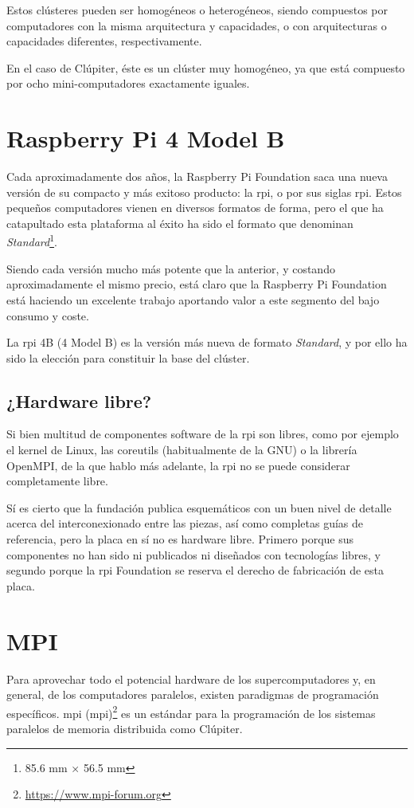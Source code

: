 Estos clústeres pueden ser homogéneos o heterogéneos, siendo compuestos por computadores con la misma arquitectura y capacidades, o con arquitecturas o capacidades diferentes, respectivamente.

En el caso de Clúpiter, éste es un clúster muy homogéneo, ya que está compuesto por ocho mini-computadores exactamente iguales.

\section{Raspberry Pi 4 Model B}
\label{sec:raspberry_pi_4_model_b}
Cada aproximadamente dos años, la Raspberry Pi Foundation saca una nueva versión de su compacto y más exitoso producto: la \acrlong{rpi}, o por sus siglas \acrshort{rpi}. Estos pequeños computadores vienen en diversos formatos de forma, pero el que ha catapultado esta plataforma al éxito ha sido el formato que denominan \textit{Standard}\footnote{85.6 mm × 56.5 mm}.

Siendo cada versión mucho más potente que la anterior, y costando aproximadamente el mismo precio, está claro que la Raspberry Pi Foundation está haciendo un excelente trabajo aportando valor a este segmento del bajo consumo y coste.

La \acrlong{rpi} 4B (4 Model B) es la versión más nueva de formato \textit{Standard}, y por ello ha sido la elección para constituir la base del clúster.

\subsection{¿Hardware libre?}
Si bien multitud de componentes software de la \acrlong{rpi} son libres, como por ejemplo el kernel de Linux, las coreutils (habitualmente de la GNU) o la librería OpenMPI, de la que hablo más adelante, la \acrlong{rpi} no se puede considerar completamente libre.

Sí es cierto que la fundación publica esquemáticos con un buen nivel de detalle acerca del interconexionado entre las piezas, así como completas guías de referencia, pero la placa en sí no es hardware libre. Primero porque sus componentes no han sido ni publicados ni diseñados con tecnologías libres, y segundo porque la \acrlong{rpi} Foundation se reserva el derecho de fabricación de esta placa. 

\section{MPI}
Para aprovechar todo el potencial hardware de los supercomputadores y, en general, de los computadores paralelos, existen paradigmas de programación específicos. \acrshort{mpi} (\acrlong{mpi})\footnote{\url{https://www.mpi-forum.org}} es un estándar para la programación de los sistemas paralelos de memoria distribuida como Clúpiter.

